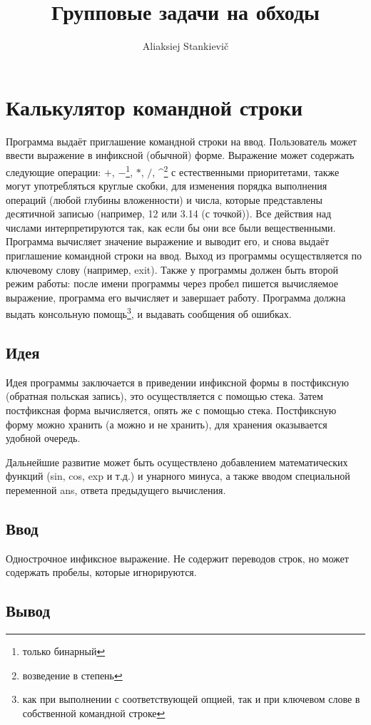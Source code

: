 \documentclass[12pt, oneside]{article}
\author{Aliaksiej Stankievič}
\title{Групповые задачи на обходы}
\begin{document}
\section{Калькулятор командной строки}

Программа выдаёт приглашение командной строки на ввод. Пользователь может ввести выражение в инфиксной (обычной) форме. Выражение может содержать следующие операции: $+$, $-$\footnote{только бинарный}, $\ast$, $/$, \textasciicircum\footnote{возведение в степень}  с естественными приоритетами, также могут употребляться круглые скобки, для изменения порядка выполнения операций (любой глубины вложенности) и числа, которые представлены десятичной записью (например, 12 или 3.14 (с точкой)). Все действия над числами интерпретируются так, как если бы они все были вещественными. Программа вычисляет значение выражение и выводит его, и снова выдаёт приглашение командной строки на ввод. Выход из программы осуществляется по ключевому слову (например, exit). Также у программы должен быть второй режим работы: после имени программы через пробел пишется вычисляемое выражение, программа его вычисляет и завершает работу. Программа должна выдать консольную помощь\footnote{как при выполнении с соответствующей опцией, так и при ключевом слове в собственной командной строке}, и выдавать сообщения об ошибках.

\subsection*{Идея}
Идея программы заключается в приведении инфиксной формы в постфиксную (обратная польская запись), это осуществляется с помощью стека. Затем постфиксная форма вычисляется, опять же с помощью стека. Постфиксную форму можно хранить (а можно и не хранить), для хранения оказывается удобной очередь.

Дальнейшие развитие может быть осуществлено добавлением математических функций (sin, cos, exp и т.д.) и унарного минуса, а также вводом специальной переменной ans, ответа предыдущего вычисления.

\subsection*{Ввод}

Однострочное инфиксное выражение. Не содержит переводов строк, но может содержать пробелы, которые игнорируются.

\subsection*{Вывод}
\end{document}
